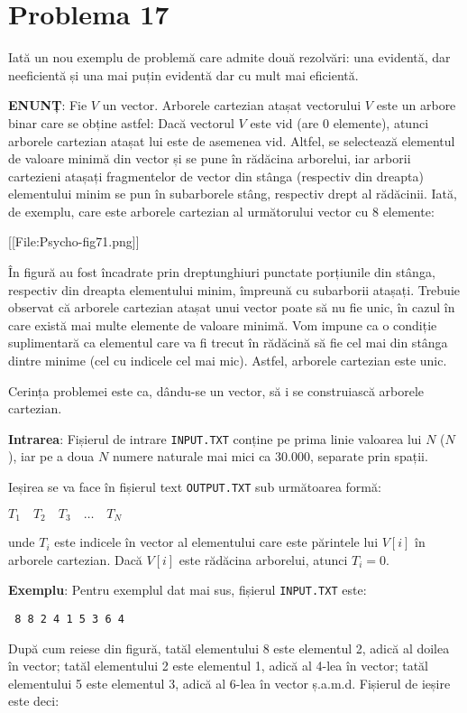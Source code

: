 \section{Problema 17}

Iată un nou exemplu de problemă care admite două rezolvări: una evidentă, dar neeficientă și una mai puțin evidentă dar cu mult mai eficientă.

{\bf ENUNȚ}: Fie $V$ un vector. Arborele cartezian atașat vectorului $V$ este un arbore binar care se obține astfel: Dacă vectorul $V$ este vid (are 0 elemente), atunci arborele cartezian atașat lui este de asemenea vid. Altfel, se selectează elementul de valoare minimă din vector și se pune în rădăcina arborelui, iar arborii cartezieni atașați fragmentelor de vector din stânga (respectiv din dreapta) elementului minim se pun în subarborele stâng, respectiv drept al rădăcinii. Iată, de exemplu, care este arborele cartezian al următorului vector cu 8 elemente:

[[File:Psycho-fig71.png]]

În figură au fost încadrate prin dreptunghiuri punctate porțiunile din stânga, respectiv din dreapta elementului minim, împreună cu subarborii atașați. Trebuie observat că arborele cartezian atașat unui vector poate să nu fie unic, în cazul în care există mai multe elemente de valoare minimă. Vom impune ca o condiție suplimentară ca elementul care va fi trecut în rădăcină să fie cel mai din stânga dintre minime (cel cu indicele cel mai mic). Astfel, arborele cartezian este unic.

Cerința problemei este ca, dându-se un vector, să i se construiască arborele cartezian.

{\bf Intrarea}: Fișierul de intrare {\tt INPUT.TXT} conține pe prima linie valoarea lui $N$ ($N$ ), iar pe a doua $N$ numere naturale mai mici ca 30.000, separate prin spații.

Ieșirea se va face în fișierul text {\tt OUTPUT.TXT} sub următoarea formă:

$T_1 \quad T_2 \quad T_3 \quad \dots \quad T_N$

unde $T_i$ este indicele în vector al elementului care este părintele lui $V[i]$ în arborele cartezian. Dacă $V[i]$ este rădăcina arborelui, atunci $T_i = 0$.

{\bf Exemplu}: Pentru exemplul dat mai sus, fișierul {\tt INPUT.TXT} este:

\texttt{
8
8 2 4 1 5 3 6 4
}

După cum reiese din figură, tatăl elementului 8 este elementul 2, adică al doilea în vector; tatăl elementului 2 este elementul 1, adică al 4-lea în vector; tatăl elementului 5 este elementul 3, adică al 6-lea în vector ș.a.m.d. Fișierul de ieșire este deci:

